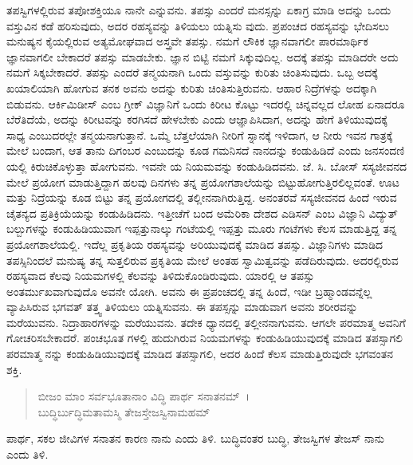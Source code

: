 ತಪಸ್ವಿಗಳಲ್ಲಿರುವ ತಪೋಶಕ್ತಿಯೂ ನಾನೇ ಎನ್ನುವನು. ತಪಸ್ಸು ಎಂದರೆ ಮನಸ್ಸನ್ನು ಏಕಾಗ್ರ ಮಾಡಿ ಅದನ್ನು ಒಂದು ವಸ್ತುವಿನ ಕಡೆ ಹರಿಸುವುದು, ಅದರ ರಹಸ್ಯವನ್ನು ತಿಳಿಯಲು ಯತ್ನಿಸು ವುದು. ಪ್ರಪಂಚದ ರಹಸ್ಯವನ್ನು ಭೇದಿಸಲು ಮನುಷ್ಯನ ಕೈಯಲ್ಲಿರುವ ಅತ್ಯಮೋಘವಾದ ಅಸ್ತ್ರವೇ ತಪಸ್ಸು. ನಮಗೆ ಲೌಕಿಕ ಜ್ಞಾನವಾಗಲೀ ಪಾರಮಾರ್ಥಿಕ ಜ್ಞಾನವಾಗಲೀ ಬೇಕಾದರೆ ತಪಸ್ಸು ಮಾಡಬೇಕು. ಜ್ಞಾನ ಬಿಟ್ಟಿ ನಮಗೆ ಸಿಕ್ಕುವುದಿಲ್ಲ. ಅದಕ್ಕೆ ತಪಸ್ಸು ಮಾಡಿದರೇ ಅದು ನಮಗೆ ಸಿಕ್ಕಬೇಕಾದರೆ. ತಪಸ್ಸು ಎಂದರೆ ತನ್ಮಯನಾಗಿ ಒಂದು ವಸ್ತುವನ್ನು ಕುರಿತು ಚಿಂತಿಸುವುದು. ಒಬ್ಬ ಅದಕ್ಕೆ ಖಯಾಲಿಯಾಗಿ ಹೋಗುವ ತನಕ ಅವನು ಅದನ್ನು ಕುರಿತು ಚಿಂತಿಸುತ್ತಿರುವನು. ಆಹಾರ ನಿದ್ರೆಗಳನ್ನು ಅದಕ್ಕಾಗಿ ಬಿಡುವನು. ಆರ್ಕಿಮಿಡೀಸ್ ಎಂಬ ಗ್ರೀಕ್ ವಿಜ್ಞಾನಿಗೆ ಒಂದು ಕಿರೀಟ ಕೊಟ್ಟು ಇದರಲ್ಲಿ ಚಿನ್ನವಲ್ಲದ ಲೋಹ ಏನಾದರೂ ಬೆರೆತಿದೆಯೆ, ಅದನ್ನು ಕಿರೀಟವನ್ನು ಕರಗಿಸದೆ ಹೇಳಬೇಕು ಎಂದು ಆಜ್ಞಾಪಿಸಿದಾಗ, ಅದನ್ನು ಹೇಗೆ ತಿಳಿಯುವುದಕ್ಕೆ ಸಾಧ್ಯ ಎಂಬುದರಲ್ಲೇ ತನ್ಮಯನಾಗುತ್ತಾನೆ. ಒಮ್ಮೆ ಬೆತ್ತಲೆಯಾಗಿ ನೀರಿಗೆ ಸ್ನಾನಕ್ಕೆ ಇಳಿದಾಗ, ಆ ನೀರು ಇವನ ಗಾತ್ರಕ್ಕೆ ಮೇಲೆ ಬಂದಾಗ, ಆತ ತಾನು ದಿಗಂಬರ ಎಂಬುದನ್ನು ಕೂಡ ಗಮನಿಸದೆ ನಾನದನ್ನು ಕಂಡುಹಿಡಿದೆ ಎಂದು ಜನಸಂದಣಿ ಯಲ್ಲಿ ಕಿರುಚಿಕೊಳ್ಳುತ್ತಾ ಹೋಗುವನು. ಇವನೇ ಯ ನಿಯಮವನ್ನು ಕಂಡುಹಿಡಿದವನು. ಜೆ. ಸಿ. ಬೋಸ್ ಸಸ್ಯಜೀವನದ ಮೇಲೆ ಪ್ರಯೋಗ ಮಾಡುತ್ತಿದ್ದಾಗ ಹಲವು ದಿನಗಳು ತನ್ನ ಪ್ರಯೋಗಶಾಲೆಯನ್ನು ಬಿಟ್ಟುಹೋಗುತ್ತಿರಲಿಲ್ಲವಂತೆ. ಊಟ ಮತ್ತು ನಿದ್ರೆಯನ್ನು ಕೂಡ ಬಿಟ್ಟು ತನ್ನ ಪ್ರಯೋಗದಲ್ಲಿ ತಲ್ಲೀನನಾಗಿರುತ್ತಿದ್ದ. ಅನಂತರವೆ ಸಸ್ಯಜೀವನದ ಹಿಂದೆ ಇರುವ ಚೈತನ್ಯದ ಪ್ರತಿಕ್ರಿಯೆಯನ್ನು ಕಂಡುಹಿಡಿದನು. ಇತ್ತೀಚೆಗೆ ಬಂದ ಅಮೆರಿಕಾ ದೇಶದ ಎಡಿಸನ್ ಎಂಬ ವಿಜ್ಞಾನಿ ವಿದ್ಯುತ್ ಬಲ್ಬುಗಳನ್ನು ಕಂಡುಹಿಡಿಯುವಾಗ ಇಪ್ಪತ್ತುನಾಲ್ಕು ಗಂಟೆಯಲ್ಲಿ ಇಪ್ಪತ್ತು ಮೂರು ಗಂಟೆಗಳು ಕೆಲಸ ಮಾಡುತ್ತಿದ್ದ ತನ್ನ ಪ್ರಯೋಗಶಾಲೆಯಲ್ಲಿ. ಇದೆಲ್ಲ ಪ್ರಕೃತಿಯ ರಹಸ್ಯವನ್ನು ಅರಿಯುವುದಕ್ಕೆ ಮಾಡಿದ ತಪಸ್ಸು. ವಿಜ್ಞಾನಿಗಳು ಮಾಡಿದ ತಪಸ್ಸಿನಿಂದಲೆ ಮನುಷ್ಯ ತನ್ನ ಸುತ್ತಲಿರುವ ಪ್ರಕೃತಿಯ ಮೇಲೆ ಅಂತಹ ಸ್ವಾಮಿತ್ವವನ್ನು ಪಡೆದಿರುವುದು. ಅದರಲ್ಲಿರುವ ರಹಸ್ಯವಾದ ಕೆಲವು ನಿಯಮಗಳಲ್ಲಿ ಕೆಲವನ್ನು ತಿಳಿದುಕೊಂಡಿರುವುದು. ಯಾರಲ್ಲಿ ಆ ತಪಸ್ಸು ಅಂತರ್ಮುಖವಾಗುವುದೊ ಅವನೇ ಯೋಗಿ. ಅವನು ಈ ಪ್ರಪಂಚದಲ್ಲಿ ತನ್ನ ಹಿಂದೆ, ಇಡೀ ಬ್ರಹ್ಮಾಂಡವನ್ನೆಲ್ಲ ವ್ಯಾಪಿಸಿರುವ ಭಗವತ್ ತತ್ತ್ವ ತಿಳಿಯಲು ಯತ್ನಿಸುವನು. ಈ ತಪಸ್ಸನ್ನು ಮಾಡುವಾಗ ಅವನು ಶರೀರವನ್ನು ಮರೆಯುವನು. ನಿದ್ರಾಹಾರಗಳನ್ನು ಮರೆಯುವನು. ತದೇಕ ಧ್ಯಾನದಲ್ಲಿ ತಲ್ಲೀನನಾಗುವನು. ಆಗಲೇ ಪರಮಾತ್ಮ ಅವನಿಗೆ ಗೋಚರಿಸಬೇಕಾದರೆ. ಪಂಚಭೂತ ಗಳಲ್ಲಿ ಹುದುಗಿರುವ ನಿಯಮಗಳನ್ನು ಕಂಡುಹಿಡಿಯುವುದಕ್ಕೆ ಮಾಡಿದ ತಪಸ್ಸಾಗಲಿ ಪರಮಾತ್ಮ ನನ್ನು ಕಂಡುಹಿಡಿಯುವುದಕ್ಕೆ ಮಾಡಿದ ತಪಸ್ಸಾಗಲಿ, ಅದರ ಹಿಂದೆ ಕೆಲಸ ಮಾಡುತ್ತಿರುವುದೇ ಭಗವಂತನ ಶಕ್ತಿ.

\begin{verse}
ಬೀಜಂ ಮಾಂ ಸರ್ವಭೂತಾನಾಂ ವಿದ್ಧಿ ಪಾರ್ಥ ಸನಾತನಮ್~।\\ಬುದ್ಧಿರ್ಬುದ್ಧಿಮತಾಮಸ್ಮಿ ತೇಜಸ್ತೇಜಸ್ವಿನಾಮಹಮ್ 
\end{verse}

{\small ಪಾರ್ಥ, ಸಕಲ ಜೀವಿಗಳ ಸನಾತನ ಕಾರಣ ನಾನು ಎಂದು ತಿಳಿ. ಬುದ್ಧಿವಂತರ ಬುದ್ಧಿ, ತೇಜಸ್ವಿಗಳ ತೇಜಸ್ ನಾನು ಎಂದು ತಿಳಿ.}

